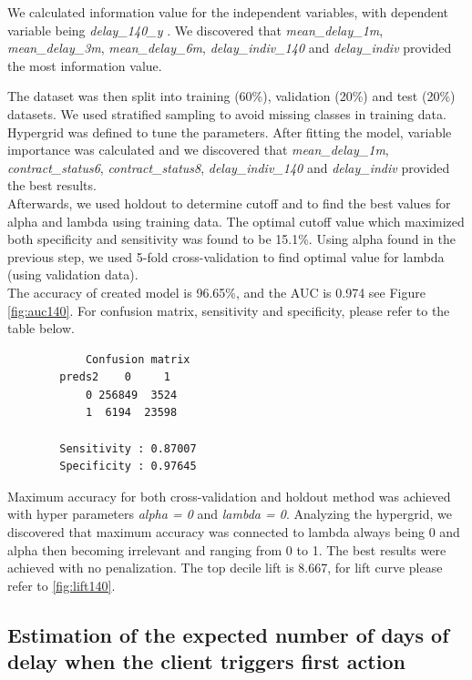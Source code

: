 \documentclass[
]{article}
\begin{document}
We calculated information value for the independent variables, with dependent variable being \emph{delay\_140\_y} . We discovered that \emph{mean\_delay\_1m}, \emph{mean\_delay\_3m}, \emph{mean\_delay\_6m}, \emph{delay\_indiv\_140} and \emph{delay\_indiv} provided the most information value.

The dataset was then split into training (60\%), validation (20\%) and test (20\%) datasets. We used stratified sampling to avoid missing classes in training data.
Hypergrid was defined to tune the parameters. After fitting the model, variable importance was calculated and we discovered that \emph{mean\_delay\_1m}, \emph{contract\_status6}, \emph{contract\_status8}, \emph{delay\_indiv\_140} and \emph{delay\_indiv} provided the best results.\\
Afterwards, we used holdout to determine cutoff and to find the best values for alpha and lambda using training data. The optimal cutoff value which maximized both specificity and sensitivity was found to be 15.1\%. Using alpha found in the previous step, we used 5-fold cross-validation to find optimal value for lambda (using validation data).\\
The accuracy of created model is 96.65\%, and the AUC is 0.974 see Figure \ref{fig:auc140}. For confusion matrix, sensitivity and specificity, please refer to the table below.

\begin{verbatim}
            Confusion matrix
        preds2    0     1
            0 256849  3524
            1  6194  23598
        
        Sensitivity : 0.87007         
        Specificity : 0.97645 
\end{verbatim}

Maximum accuracy for both cross-validation and holdout method was achieved with hyper parameters \emph{alpha = 0} and \emph{lambda = 0}. Analyzing the hypergrid, we discovered that maximum accuracy was connected to lambda always being 0 and alpha then becoming irrelevant and ranging from 0 to 1. The best results were achieved with no penalization. The top decile lift is 8.667, for lift curve please refer to \ref{fig:lift140}.

\hypertarget{estimation-of-the-expected-number-of-days-of-delay-when-the-client-triggers-first-action}{%
\subsection{Estimation of the expected number of days of delay when the client triggers first action}\label{estimation-of-the-expected-number-of-days-of-delay-when-the-client-triggers-first-action}}
\end{document}
